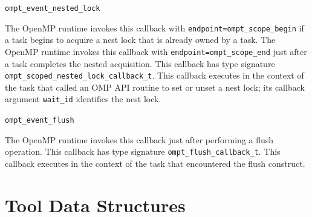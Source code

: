 \documentclass{article}
\newcommand{\descheader}[1]{{\needspace{3\baselineskip}\vspace{1em}\noindent \fbox{#1}}}
\begin{document}
\begin{description}
\item \lstinline|ompt_event_nested_lock|

\sloppy
   The OpenMP runtime invokes this callback with \lstinline|endpoint=|\lstinline|ompt_scope_begin| if a task begins to acquire a nest lock that is already owned by a task.
   The OpenMP runtime invokes this callback with \lstinline|endpoint=|\lstinline|ompt_scope_end|  just after a task completes the nested acquisition.
   This callback  has type signature \lstinline|ompt_scoped_nested_lock_callback_t|. 
   This callback executes in the context of the task that called an OMP API routine to set or unset a nest lock; its
   callback argument \lstinline|wait_id| identifies the nest lock.

\end{description}

\descheader{Miscellaneous}

\begin{description}

\item \lstinline|ompt_event_flush|

 \sloppy
   The OpenMP runtime invokes this callback just after
   performing a flush operation.  
   This callback has type signature \lstinline|ompt_flush_callback_t|. 
   This callback executes in the context of the task that encountered the flush construct.
\end{description}

\section{Tool Data Structures}
\label{sec:data}
\end{document}
